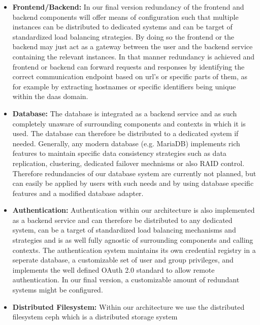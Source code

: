 \documentclass[runningheads]{llncs}
\begin{document}
\begin{itemize}
	\item \textbf{Frontend/Backend: } In our final version
	      redundancy of the frontend and backend components will offer means of configuration
	      such that multiple instances can be distributed to dedicated systems
	      and can be target of standardized load balancing strategies.
	      By doing so the frontend or the backend may just act as a gateway
	      between the user and the backend service containing the relevant instances.
	      In that manner redundancy is achieved and frontend or backend
	      can forward requests and responses
	      by identifying the correct communication endpoint
	      based on url's or specific parts of them,
	      as for example by extracting hostnames
	      or specific identifiers being unique within the daas domain.
	\item \textbf{Database: } The database is integrated as a backend service
	      and as such completely unaware of surrounding components
	      and contexts in which it is used.
	      The database can therefore be distributed to a dedicated system if needed.
	      Generally, any modern database (e.g. MariaDB) implements rich features
	      to maintain specific data consistency strategies
	      such as data replication, clustering,
	      dedicated failover mechnisms or also RAID control.
	      Therefore redundancies of our database system are currently not planned,
	      but can easily be applied by users with such needs
	      and by using database specific features and a modified database adapter.
	\item \textbf{Authentication: } Authentication within our architecture
	      is also implemented as a backend service
	      and can therefore be distributed to any dedicated system,
	      can be a target of standardized load balancing mechanisms and strategies
	      and is as well fully agnostic of surrounding components
	      and calling contexts.
	      The authentication system maintains
	      its own credential registry in a seperate database,
	      a customizable set of user and group privileges,
	      and implements the well defined OAuth 2.0 standard
	      to allow remote authentication.
	      In our final version, a customizable amount of redundant systems might be configured.
	\item \textbf{Distributed Filesystem: } Within our architecture
	      we use the distributed filesystem ceph which is a distributed storage system

\end{itemize}
\end{document}

